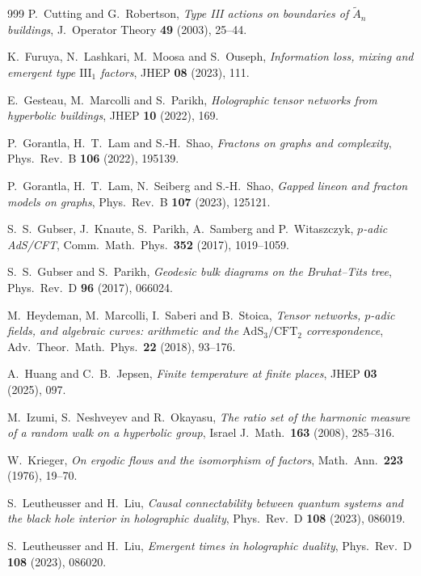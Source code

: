 \begin{thebibliography}{999}
 P.~Cutting and G.~Robertson, \emph{Type III actions on boundaries of $\widetilde A_n$ buildings}, J.\ Operator Theory \textbf{49} (2003), 25--44.

 K.~Furuya, N.~Lashkari, M.~Moosa and S.~Ouseph, \emph{Information loss, mixing and emergent type $\mathrm{III}_1$ factors}, JHEP \textbf{08} (2023), 111.

 E.~Gesteau, M.~Marcolli and S.~Parikh, \emph{Holographic tensor networks from hyperbolic buildings}, JHEP \textbf{10} (2022), 169.

 P.~Gorantla, H.~T.~Lam and S.-H.~Shao, \emph{Fractons on graphs and complexity}, Phys.\ Rev.\ B \textbf{106} (2022), 195139.

 P.~Gorantla, H.~T.~Lam, N.~Seiberg and S.-H.~Shao, \emph{Gapped lineon and fracton models on graphs}, Phys.\ Rev.\ B \textbf{107} (2023), 125121.

 S.~S.~Gubser, J.~Knaute, S.~Parikh, A.~Samberg and P.~Witaszczyk, \emph{$p$-adic AdS/CFT}, Comm.\ Math.\ Phys.\ \textbf{352} (2017), 1019--1059.

 S.~S.~Gubser and S.~Parikh, \emph{Geodesic bulk diagrams on the Bruhat--Tits tree}, Phys.\ Rev.\ D \textbf{96} (2017), 066024.

 M.~Heydeman, M.~Marcolli, I.~Saberi and B.~Stoica, \emph{Tensor networks, $p$-adic fields, and algebraic curves: arithmetic and the $\mathrm{AdS}_3/\mathrm{CFT}_2$ correspondence}, Adv.\ Theor.\ Math.\ Phys.\ \textbf{22} (2018), 93--176.

 A.~Huang and C.~B.~Jepsen, \emph{Finite temperature at finite places}, JHEP \textbf{03} (2025), 097.

 M.~Izumi, S.~Neshveyev and R.~Okayasu, \emph{The ratio set of the harmonic measure of a random walk on a hyperbolic group}, Israel J.\ Math.\ \textbf{163} (2008), 285--316.

 W.~Krieger, \emph{On ergodic flows and the isomorphism of factors}, Math.\ Ann.\ \textbf{223} (1976), 19--70.

 S.~Leutheusser and H.~Liu, \emph{Causal connectability between quantum systems and the black hole interior in holographic duality}, Phys.\ Rev.\ D \textbf{108} (2023), 086019.

 S.~Leutheusser and H.~Liu, \emph{Emergent times in holographic duality}, Phys.\ Rev.\ D \textbf{108} (2023), 086020.


\end{thebibliography}
